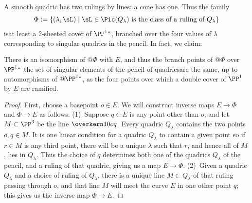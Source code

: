 A smooth quadric has two rulings by lines; a cone has one. Thus the 
%
family
$$
\Phi := \{ (\lambda, \sL) \mid \sL \in \Pic(Q_\lambda) \text{ is the class of a ruling of } Q_\lambda \}
$$
is\emdash at least 
%
a 2-sheeted cover of $\PP^1` `$, 
%
branched over the four values of $\lambda$ corresponding to singular
quadrics in the pencil. In fact, we claim:
%
%

\begin{proposition}\label{rulings on pencil}
There is an isomorphism of $@\Phi$ with $E$, and thus the branch points
of $@\Phi$ over $\PP^1` `$\emdash 
{}
the set of singular elements of
the pencil of quadrics\emdash are the same, up to automorphisms of
$@\PP^1` `$, as the four points over which a double cover of $\PP^1$ by $E$
are ramified.
\unif
\end{proposition} 

\begin{proof}
First, choose a basepoint $o \in E$. We will construct inverse maps $E \to \Phi$ and $\Phi \to E$ as follows:
\smallbreak\noindent
(1)\,
Suppose $q \in E$ is any point other than $o$, and let 
$M\subset \PP^3$ be the line $\overkern10{oq}$.
Every quadric $Q_\lambda$ contains the two points $o, q \in M$. It is one linear condition
for a quadric $Q_{\lambda}$ to contain a given point  so if $r\in M$ is any third point, there will be a unique $\lambda$ such that $r$, and hence all of $M$, lies in $Q_\lambda$. Thus the choice of $q$ determines both one of the quadrics $Q_\lambda$ of the pencil, and a ruling of that quadric, giving us a map $E \to \Phi$.
\smallbreak\noindent
(2)\,
Given a quadric $Q_\lambda$ and a choice of ruling of $Q_\lambda$, there is a unique line $M \subset Q_\lambda$ of that ruling passing through $o$, and that line $M$ will meet the curve $E$ in one other point $q$; this gives us the inverse map $\Phi \to E$.
\end{proof}

